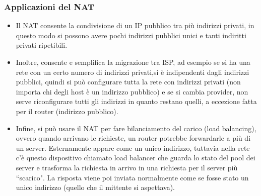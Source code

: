 \subsubsection{Applicazioni del NAT}
\begin{itemize}
  \item Il NAT consente la condivisione di un IP pubblico tra più indirizzi privati, in questo modo si possono avere pochi indirizzi pubblici unici e tanti indiritti privati ripetibili.
  \item Inoltre, consente e semplifica la migrazione tra ISP, ad esempio se si ha una rete con un certo numero di indirizzi privati,si è indipendenti dagli indirizzi pubblici, quindi si può configurare tutta la rete con indirizzi privati (non importa chi degli host è un indirizzo pubblico) e se si cambia provider, non serve riconfigurare tutti gli indirizzi in quanto restano quelli, a eccezione fatta per il router (indirizzo pubblico).
  \item Infine, si può usare il NAT per fare bilanciamento del carico (load balancing), ovvero quando arrivano le richieste, un router potrebbe forwardarle a più di un server. Esternamente appare come un unico indirizzo, tuttavia nella rete c’è questo dispositivo chiamato load balancer che guarda lo stato del pool dei server e trasforma la richiesta in arrivo in una richiesta per il server più “scarico". La risposta viene poi inviata normalmente come se fosse stato un unico indirizzo (quello che il mittente si aspettava).
\end{itemize}
